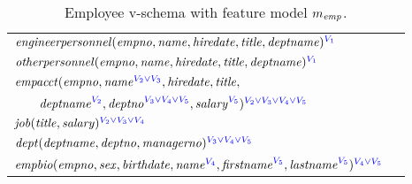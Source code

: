 \begin{table}
\caption{ Employee v-schema with feature model $\fModel_\employee$.}
\vspace{-8pt}
\label{tab:emp-vsch}
\begin{center}
\small
\begin{tabular} {|l|l|}
\hline
\rule{0pt}{3ex}%
$\engemp(\empno, \name, \hiredate,\titleatt,\deptname)^{\textcolor{blue}
\vOne}$ \\[1.1ex]
$\othemp(\empno, \name, \hiredate, \titleatt, \deptname)^{\textcolor{blue}
\vOne}$ \\[1.1ex]
$\empacct(\empno, \annot [\textcolor{blue}{\vTwo \vee \vThree}] \name,
\hiredate, \titleatt,$ \\
$\qquad\annot[\textcolor{blue} \vTwo]\deptname, \annot
[\textcolor{blue} {\vThree \vee \vFour \vee \vFive}]\deptno,\annot
[\textcolor{blue} \vFive]\salary)^{\textcolor{blue}{\vTwo \vee \vThree \vee
\vFour \vee \vFive}}$ \\[1.1ex]
$\job(\titleatt, \salary)^{\textcolor{blue}{\vTwo \vee \vThree \vee \vFour}}$
\\[1.1ex]
$\dept(\deptname, \deptno, \managerno)^{\textcolor{blue}{\vThree \vee \vFour
\vee \vFive}}$ \\[1.1ex]
$\empbio(\empno, \sex, \birthdate, \annot [\textcolor{blue} \vFour] \name,
\annot[\textcolor{blue}\vFive]{\fname}, \annot[\textcolor{blue}
\vFive]{\lname})^{\textcolor{blue} {\vFour \vee \vFive}}$ \\
\hline
\end{tabular}
\vspace{-12pt}
\end{center}
\end{table}
